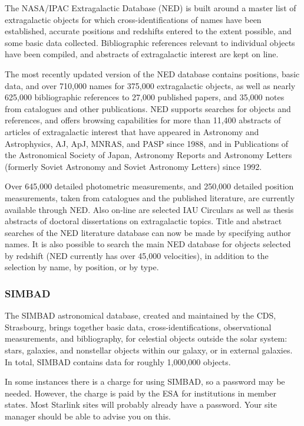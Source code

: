\documentclass[twoside,11pt]{article}
\newcommand{\htmladdnormallink}[2]{#1}
\newcommand{\xlabel}[1]{}
\newcommand{\STARLINKref}{\htmladdnormallink{Starlink}{http://star-www.rl.ac.uk/}}
\newcommand{\SIMBADref}{\htmladdnormallink{SIMBAD}{http://cdsweb.u-strasbg.fr/Simbad.html}}
\newcommand{\NEDref}{\htmladdnormallink{NED}{http://ds.internic.net/cgi-bin/enthtml/database/ned.b}}
\begin{document}
The NASA/IPAC Extragalactic Database ({\NEDref}) is built around a master list of
extragalactic objects for which cross-identifications of names have been
established, accurate positions and redshifts entered to the extent possible,
and some basic data collected. Bibliographic references relevant to
individual objects have been compiled, and abstracts of extragalactic
interest are kept on line. 

The most recently updated version of the NED database contains positions,
basic data, and over 710,000 names for 375,000 extragalactic objects, as well
as nearly 625,000 bibliographic references to 27,000 published papers, and
35,000 notes from catalogues and other publications. NED supports searches for
objects and references, and offers browsing capabilities for more than 11,400
abstracts of articles of extragalactic interest that have appeared in
Astronomy and Astrophysics, AJ, ApJ, MNRAS, and PASP since 1988, and in
Publications of the Astronomical Society of Japan, Astronomy Reports and
Astronomy Letters (formerly Soviet Astronomy and Soviet Astronomy Letters)
since 1992. 

Over 645,000 detailed photometric measurements, and 250,000 detailed position
measurements, taken from catalogues and the published literature, are currently
available through NED. Also on-line are selected IAU Circulars as well as
thesis abstracts of doctoral dissertations on extragalactic topics. Title and
abstract searches of the NED literature database can now be made by
specifying author names. It is also possible to search the main NED database
for objects selected by redshift ({\NEDref} currently has over 45,000 velocities),
in addition to the selection by name, by position, or by type.

\subsubsection{{\SIMBADref}} \xlabel{SIMBAD}
\label{sec:simbad}
 
The {\SIMBADref} astronomical database, created and maintained by the CDS,
Strasbourg, brings together basic data, cross-identifications, observational
measurements, and bibliography, for celestial objects outside the solar
system: stars, galaxies, and nonstellar objects within our galaxy, or in
external galaxies. In total, SIMBAD contains data for roughly
1,000,000 objects. 

In some instances there is a charge for using SIMBAD, so a password may be needed. 
However, the charge is paid by the ESA for institutions in member states. Most 
{\STARLINKref} sites will probably already have a password. Your site manager 
should be able to advise you on this.
\end{document}
